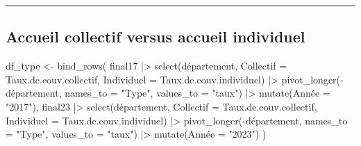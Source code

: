 \documentclass[
  letterpaper,
  DIV=11,
  numbers=noendperiod]{scrartcl}
\newenvironment{Shaded}{\begin{snugshade}}{\end{snugshade}}
\newcommand{\AttributeTok}[1]{\textcolor[rgb]{0.40,0.45,0.13}{#1}}
\newcommand{\FunctionTok}[1]{\textcolor[rgb]{0.28,0.35,0.67}{#1}}
\newcommand{\NormalTok}[1]{\textcolor[rgb]{0.00,0.23,0.31}{#1}}
\newcommand{\OtherTok}[1]{\textcolor[rgb]{0.00,0.23,0.31}{#1}}
\newcommand{\SpecialCharTok}[1]{\textcolor[rgb]{0.37,0.37,0.37}{#1}}
\newcommand{\StringTok}[1]{\textcolor[rgb]{0.13,0.47,0.30}{#1}}
\begin{document}
\begin{center}\rule{0.5\linewidth}{0.5pt}\end{center}

\subsection{Accueil collectif versus accueil
individuel}\label{accueil-collectif-versus-accueil-individuel}

\begin{Shaded}
\begin{Highlighting}[]
\NormalTok{df\_type }\OtherTok{\textless{}{-}} \FunctionTok{bind\_rows}\NormalTok{(}
\NormalTok{  final17 }\SpecialCharTok{|\textgreater{}}
    \FunctionTok{select}\NormalTok{(département,}
           \AttributeTok{Collectif  =}\NormalTok{ Taux.de.couv.collectif,}
           \AttributeTok{Individuel =}\NormalTok{ Taux.de.couv.individuel) }\SpecialCharTok{|\textgreater{}}
    \FunctionTok{pivot\_longer}\NormalTok{(}\SpecialCharTok{{-}}\NormalTok{département, }\AttributeTok{names\_to =} \StringTok{"Type"}\NormalTok{, }\AttributeTok{values\_to =} \StringTok{"taux"}\NormalTok{) }\SpecialCharTok{|\textgreater{}}
    \FunctionTok{mutate}\NormalTok{(Année }\OtherTok{=} \StringTok{"2017"}\NormalTok{),}
\NormalTok{  final23 }\SpecialCharTok{|\textgreater{}}
    \FunctionTok{select}\NormalTok{(département,}
           \AttributeTok{Collectif  =}\NormalTok{ Taux.de.couv.collectif,}
           \AttributeTok{Individuel =}\NormalTok{ Taux.de.couv.individuel) }\SpecialCharTok{|\textgreater{}}
    \FunctionTok{pivot\_longer}\NormalTok{(}\SpecialCharTok{{-}}\NormalTok{département, }\AttributeTok{names\_to =} \StringTok{"Type"}\NormalTok{, }\AttributeTok{values\_to =} \StringTok{"taux"}\NormalTok{) }\SpecialCharTok{|\textgreater{}}
    \FunctionTok{mutate}\NormalTok{(Année }\OtherTok{=} \StringTok{"2023"}\NormalTok{)}
\NormalTok{)}


\end{Highlighting}
\end{Shaded}
\end{document}
